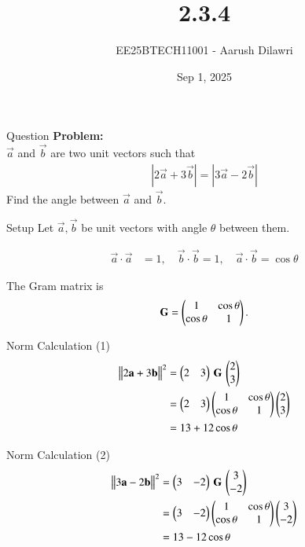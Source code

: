 \documentclass{beamer}
\title{2.3.4}
\date{Sep 1, 2025}
\author{EE25BTECH11001 - Aarush Dilawri}
\begin{document}
\frame{\titlepage}

\begin{frame}{Question}
\textbf{Problem:}\\[5pt]
$\vec{a}$ and $\vec{b}$ are two unit vectors such that
\begin{align}
    \left| 2\vec{a} + 3\vec{b} \right| = \left| 3\vec{a} - 2\vec{b} \right|
\end{align}
Find the angle between $\vec{a}$ and $\vec{b}$.
\end{frame}

\begin{frame}{Setup}
Let $\vec{a}, \vec{b}$ be unit vectors with angle $\theta$ between them.  

\begin{align*}
\vec{a}\cdot\vec{a} &= 1, \quad \vec{b}\cdot\vec{b} = 1, \quad \vec{a}\cdot\vec{b} = \cos\theta
\end{align*}

The Gram matrix is
\begin{align*}
\mathbf{G} =
\begin{pmatrix}
1 & \cos\theta \\
\cos\theta & 1
\end{pmatrix}.
\end{align*}
\end{frame}

\begin{frame}{Norm Calculation (1)}
\begin{align}
\big\lVert 2\mathbf{a} + 3\mathbf{b} \big\rVert^2 
&= \begin{pmatrix}2 & 3\end{pmatrix} \, \mathbf{G} \, \begin{pmatrix}2 \\ 3\end{pmatrix} \\
&= \begin{pmatrix}2 & 3\end{pmatrix}
\begin{pmatrix}
1 & \cos\theta \\
\cos\theta & 1
\end{pmatrix}
\begin{pmatrix}2 \\ 3\end{pmatrix} \\
&= 13 + 12\cos\theta
\end{align}
\end{frame}

\begin{frame}{Norm Calculation (2)}
\begin{align}
\big\lVert 3\mathbf{a} - 2\mathbf{b} \big\rVert^2 
&= \begin{pmatrix}3 & -2\end{pmatrix} \, \mathbf{G} \, \begin{pmatrix}3 \\ -2\end{pmatrix} \\
&= \begin{pmatrix}3 & -2\end{pmatrix}
\begin{pmatrix}
1 & \cos\theta \\
\cos\theta & 1
\end{pmatrix}
\begin{pmatrix}3 \\ -2\end{pmatrix} \\
&= 13 - 12\cos\theta
\end{align}
\end{frame}
\end{document}
